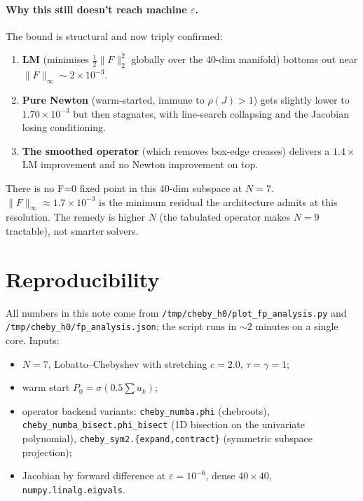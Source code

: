 \documentclass[11pt]{article}
\begin{document}
\paragraph{Why this still doesn't reach machine $\varepsilon$.}
The bound is structural and now triply confirmed:
\begin{enumerate}
  \item \textbf{LM} (minimises $\tfrac{1}{2}\|F\|_2^2$ globally over the
        40-dim manifold) bottoms out near $\|F\|_\infty \sim 2\!\times\!10^{-3}$.
  \item \textbf{Pure Newton} (warm-started, immune to $\rho(J)>1$) gets
        slightly lower to $1.70\!\times\!10^{-3}$ but then stagnates,
        with line-search collapsing and the Jacobian losing conditioning.
  \item \textbf{The smoothed operator} (which removes box-edge creases)
        delivers a $1.4\times$ LM improvement and no Newton improvement
        on top.
\end{enumerate}

There is no F=0 fixed point in this 40-dim subspace at $N{=}7$.
$\|F\|_\infty \approx 1.7\!\times\!10^{-3}$ is the minimum residual the
architecture admits at this resolution. The remedy is higher $N$ (the
tabulated operator makes $N{=}9$ tractable), not smarter solvers.

\section{Reproducibility}

All numbers in this note come from
\texttt{/tmp/cheby\_h0/plot\_fp\_analysis.py} and
\texttt{/tmp/cheby\_h0/fp\_analysis.json}; the script runs in $\sim$2 minutes
on a single core. Inputs:
\begin{itemize}
  \item $N{=}7$, Lobatto--Chebyshev with stretching $c{=}2.0$, $\tau{=}\gamma{=}1$;
  \item warm start $P_0 = \sigma(0.5\sum u_k)$;
  \item operator backend variants: \texttt{cheby\_numba.phi} (chebroots),
        \texttt{cheby\_numba\_bisect.phi\_bisect} (1D bisection on the
        univariate polynomial), \texttt{cheby\_sym2.\{expand,contract\}}
        (symmetric subspace projection);
  \item Jacobian by forward difference at $\varepsilon = 10^{-6}$, dense
        $40\!\times\!40$, \texttt{numpy.linalg.eigvals}.
\end{itemize}
\end{document}
